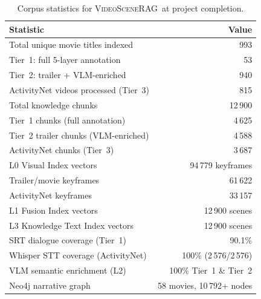 \documentclass[11pt]{article}
\newcommand{\system}{\textsc{VideoSceneRAG}}
\begin{document}
\begin{table}[!htb]
\centering
\begin{tabular}{>{\raggedright\arraybackslash}p{5.8cm} r}
\toprule
\textbf{Statistic} & \textbf{Value} \\
\midrule
Total unique movie titles indexed   & 993 \\
\quad Tier~1: full 5-layer annotation & 53 \\
\quad Tier~2: trailer + VLM-enriched & 940 \\
ActivityNet videos processed (Tier~3) & 815 \\
Total knowledge chunks              & 12\,900 \\
\quad Tier~1 chunks (full annotation) & 4\,625 \\
\quad Tier~2 trailer chunks (VLM-enriched) & 4\,588 \\
\quad ActivityNet chunks (Tier~3)   & 3\,687 \\
L0 Visual Index vectors             & 94\,779 keyframes \\
\quad Trailer/movie keyframes       & 61\,622 \\
\quad ActivityNet keyframes         & 33\,157 \\
L1 Fusion Index vectors             & 12\,900 scenes \\
L3 Knowledge Text Index vectors     & 12\,900 scenes \\
SRT dialogue coverage (Tier~1)      & 90.1\% \\
Whisper STT coverage (ActivityNet)  & 100\% (2\,576/2\,576) \\
VLM semantic enrichment (L2)        & 100\% Tier~1 \& Tier~2 \\
Neo4j narrative graph               & 58 movies, 10\,792+ nodes \\
\bottomrule
\end{tabular}
\caption{Corpus statistics for \system\ at project completion.}
\label{tab:corpus}
\end{table}
\end{document}
